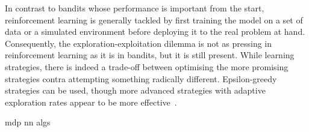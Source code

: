 In contrast to bandits whose performance is important from the start, reinforcement learning is generally tackled by first training the model on a set of data or a simulated environment before deploying it to the real problem at hand.
Consequently, the exploration-exploitation dilemma is not as pressing in reinforcement learning as it is in bandits, but it is still present.
While learning strategies, there is indeed a trade-off between optimising the more promising strategies contra attempting something radically different.
Epsilon-greedy strategies can be used, though more advanced strategies with adaptive exploration rates appear to be more effective~\autocite{tokic2011}.



{mdp}
{nn}
{algs}